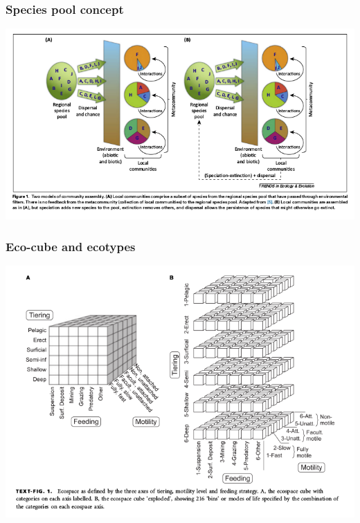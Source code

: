 \documentclass{beamer}
\begin{document}
\begin{frame}
  \frametitle{Species pool concept}

  \begin{center}
    \includegraphics[height=0.8\textheight,width=\textwidth,keepaspectratio=true]{figure/schemske_pool}
  \end{center}

\end{frame}


\begin{frame}
  \frametitle{Eco-cube and ecotypes}

  \begin{center}
    \includegraphics[height=0.8\textheight,width=\textwidth,keepaspectratio=true]{figure/ecocube}
  \end{center}

\end{frame}
\end{document}
